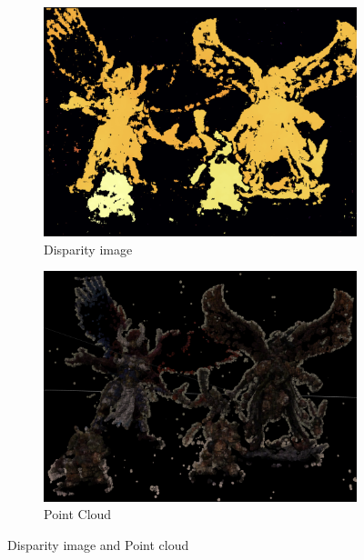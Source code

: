 \documentclass[12pt]{amsart}
\begin{document}
\begin{figure}[h]
    \centering
    \begin{subfigure}{.5\textwidth}
      \centering
      \includegraphics[width=0.98\linewidth]{disparitymap.png}
      \caption{Disparity image}
      \label{fig:disparityimg}
    \end{subfigure}%
    \begin{subfigure}{.5\textwidth}
      \centering
      \includegraphics[width=0.98\linewidth]{pointcloud.png}
      \caption{Point Cloud}
      \label{fig:pointcloud}
    \end{subfigure}
    \caption{Disparity image and Point cloud}
    \label{fig:depth}
\end{figure}
\end{document}
